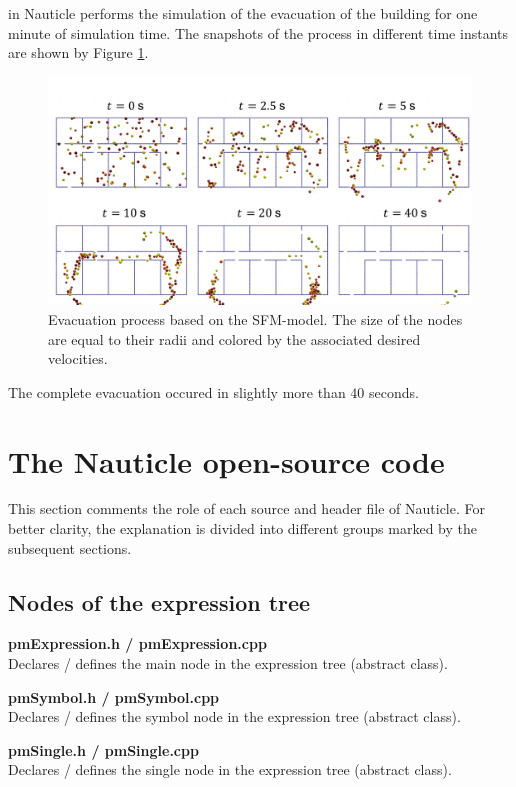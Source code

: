 \documentclass[a4paper,12pt,openany]{book}
\theoremstyle{break}
\begin{document}
in Nauticle performs the simulation of the evacuation of the building for one minute of simulation time. The snapshots of the process in different time instants are shown by Figure \ref{fig:SMF_result}.
\begin{figure}[H]
  \includegraphics[scale=0.6]{evacuation_result.pdf}
  \centering
  \caption{Evacuation process based on the SFM-model. The size of the nodes are equal to their radii and colored by the associated desired velocities.}
  \label{fig:SMF_result}
\end{figure}\vspace*{3pt}
The complete evacuation occured in slightly more than $40$ seconds.

\section{The Nauticle open-source code}
This section comments the role of each source and header file of Nauticle. For better clarity, the explanation is divided into different groups marked by the subsequent sections.
\subsection{Nodes of the expression tree}

\textbf{pmExpression.h / pmExpression.cpp} \\
Declares / defines the main node in the expression tree (abstract class).

\textbf{pmSymbol.h / pmSymbol.cpp} \\
Declares / defines the symbol node in the expression tree (abstract class).

\textbf{pmSingle.h / pmSingle.cpp} \\
Declares / defines the single node in the expression tree (abstract class).
\end{document}
